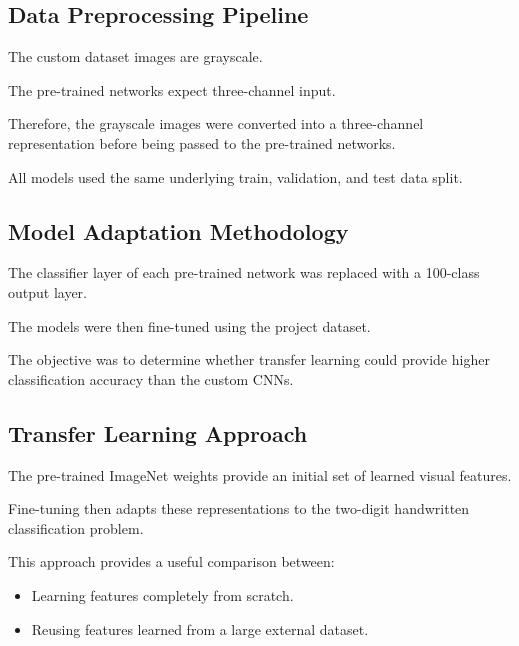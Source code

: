\documentclass[12pt,a4paper]{report}
\begin{document}
\subsection{Data Preprocessing Pipeline}

The custom dataset images are grayscale.

The pre-trained networks expect three-channel input.

Therefore, the grayscale images were converted into a
three-channel representation before being passed to the
pre-trained networks.

All models used the same underlying train, validation, and test
data split.

\subsection{Model Adaptation Methodology}

The classifier layer of each pre-trained network was replaced
with a 100-class output layer.

The models were then fine-tuned using the project dataset.

The objective was to determine whether transfer learning could
provide higher classification accuracy than the custom CNNs.

\subsection{Transfer Learning Approach}

The pre-trained ImageNet weights provide an initial set of
learned visual features.

Fine-tuning then adapts these representations to the
two-digit handwritten classification problem.

This approach provides a useful comparison between:

\begin{itemize}
    \item Learning features completely from scratch.
    \item Reusing features learned from a large external dataset.
\end{itemize}
\end{document}
